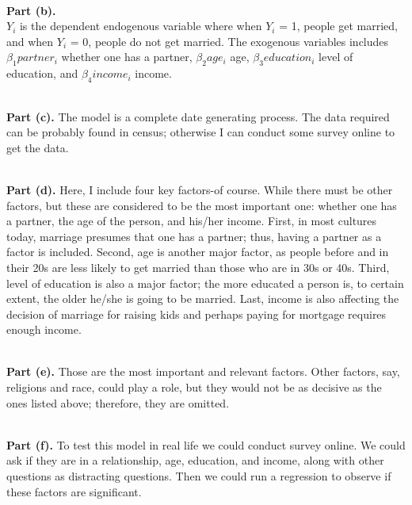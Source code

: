 \documentclass[letterpaper,12pt]{article}
\theoremstyle{definition}
\begin{document}
\noindent\\\textbf{Part (b).}
\\\textbf{$Y_{i}$} is the dependent endogenous variable where when $Y_{i}$ = 1, people get married, and when $Y_{i}$ = 0, people do not get married. The exogenous variables includes $\beta_{1}partner_{i}$ whether one has a partner, $\beta_{2}age_{i}$ age, $\beta_{3}education_{i}$ level of education, and $\beta_{4}income_{i}$ income.

\noindent\\\textbf{Part (c).}
The model is a complete date generating process. The data required can be probably found in census; otherwise I can conduct some survey online to get the data. 

\noindent\\\textbf{Part (d).}
Here, I include four key factors-of course. While there must be other factors, but these are considered to be the most important one: whether one has a partner, the age of the person, and his/her income. First, in most cultures today, marriage presumes that one has a partner; thus, having a partner as a factor is included. Second, age is another major factor, as people before and in their 20s are less likely to get married than those who are in 30s or 40s. Third, level of education is also a major factor; the more educated a person is, to certain extent, the older he/she is going to be married. Last, income is also affecting the decision of marriage for raising kids and perhaps paying for mortgage requires enough income.  

\noindent\\\textbf{Part (e).} 
Those are the most important and relevant factors. Other factors, say, religions and race, could play a role, but they would not be as decisive as the ones listed above; therefore, they are omitted. 

\noindent\\\textbf{Part (f).}
To test this model in real life we could conduct survey online. We could ask if they are in a relationship, age, education, and income, along with other questions as distracting questions. Then we could run a regression to observe if these factors are significant.  
\end{document}
